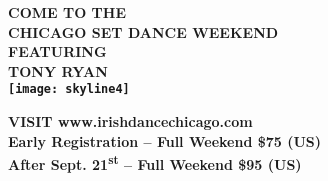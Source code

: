 
\fontsize{16}{20} \bfseries COME TO THE\\
\fontsize{26}{30} \bfseries CHICAGO SET DANCE WEEKEND\\
\fontsize{18}{20} \bfseries{\vspace*{1em}FEATURING\\}
\fontsize{36}{40}\bfseries TONY RYAN\\
\vspace*{0.5em}
\texttt{[image: skyline4]}

\fontsize{16}{20} \bfseries \vspace*{2em}VISIT www.irishdancechicago.com\\ 
\fontsize{16}{20} \bfseries {\vspace*{1em}Early Registration – Full Weekend \$75 (US)\\}
\fontsize{16}{20} \bfseries {\vspace*{1em}After Sept. 21\textsuperscript{st} – Full Weekend \$95 (US)\\}


